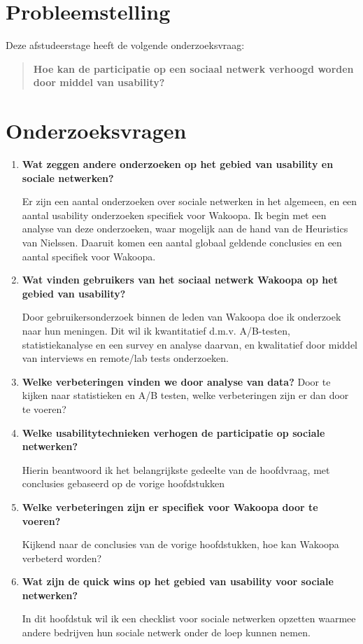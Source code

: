 \documentclass[a4paper, 10pt, pdftex]{article}
\begin{document}
\section{Probleemstelling}
Deze afstudeerstage heeft de volgende onderzoeksvraag:
\begin{quotation}

 \textbf{Hoe kan de participatie op een sociaal netwerk verhoogd worden door middel van usability?}
\end{quotation}


\section{Onderzoeksvragen}
\begin{enumerate}
\item
 \textbf{Wat zeggen andere onderzoeken op het gebied van usability en sociale netwerken?}

Er zijn een aantal onderzoeken over sociale netwerken in het algemeen, en een aantal usability onderzoeken specifiek voor Wakoopa. Ik begin met een analyse van deze onderzoeken, waar mogelijk aan de hand van de Heuristics van Nielssen. Daaruit komen een aantal globaal geldende conclusies en een aantal specifiek voor Wakoopa.

\item
\textbf{Wat vinden gebruikers van het sociaal netwerk Wakoopa op het gebied van usability?}

Door gebruikersonderzoek binnen de leden van Wakoopa doe ik onderzoek naar hun meningen. Dit wil ik kwantitatief d.m.v. A/B-testen, statistiekanalyse en een survey en analyse daarvan, en kwalitatief door middel van interviews en remote/lab tests onderzoeken.

\item
\textbf{Welke verbeteringen vinden we door analyse van data?}
Door te kijken naar statistieken en A/B testen, welke verbeteringen zijn er dan door te voeren?

\item
\textbf{Welke usabilitytechnieken verhogen de participatie op sociale netwerken?}

Hierin beantwoord ik het belangrijkste gedeelte van de hoofdvraag, met conclusies gebaseerd op de vorige hoofdstukken

\item
\textbf{Welke verbeteringen zijn er specifiek voor Wakoopa door te voeren?}

Kijkend naar de conclusies van de vorige hoofdstukken, hoe kan Wakoopa verbeterd worden?

\item
\textbf{Wat zijn de quick wins op het gebied van usability voor sociale netwerken?}

In dit hoofdstuk wil ik een checklist voor sociale netwerken opzetten waarmee andere bedrijven hun sociale netwerk onder de loep kunnen nemen.
\end{enumerate}
\end{document}
